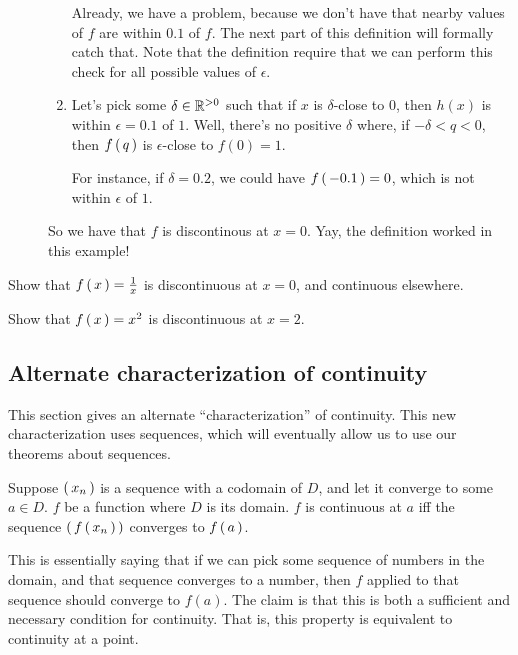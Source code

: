 \begin{example}
\begin{description}
\begin{enumerate}
      Already, we have a problem, because we don't have that nearby values of
      $f$ are within $0.1$ of $f$. The next part of this definition will
      formally catch that. Note that the definition  require that we
      can perform this check for all possible values of $\epsilon$.

    \item Let's pick some $\delta \in \mathbb{R}^{>0}$ such that if $x$ is
      $\delta$-close to $0$, then $h(x)$ is within $\epsilon = 0.1$ of
      $1$. Well, there's no positive $\delta$ where, if $-\delta < q < 0$, then
      $f \left(\, q \,\right)$ is $\epsilon$-close to $f(0) = 1$.

      For instance, if $\delta = 0.2$, we could have $f \left(\, -0.1 \,\right) = 0$, which
      is not within $\epsilon$ of $1$.
    \end{enumerate}

    So we have that $f$ is discontinous at $x = 0$. Yay, the definition worked
    in this example!
  \end{description}
\end{example}

\begin{exercise}
  Show that $f \left(\, x \,\right) = \frac{1}{x}$ is discontinuous at $x = 0$, and
  continuous elsewhere.
\end{exercise}
\begin{exercise}
  Show that $f \left(\, x \,\right) = x^2$ is discontinuous at $x = 2$.
\end{exercise}

\subsection{Alternate characterization of continuity}

This section gives an alternate ``characterization'' of continuity. This new
characterization uses sequences, which will eventually allow us to use our
theorems about sequences.

\begin{theorem}
  \label{thm:cont-sequence}
  Suppose $\left(\, x_n \,\right)$ is a sequence with a codomain of $D$, and let it
  converge to some $a \in D$. $f$ be a function where $D$ is its domain. $f$ is
  continuous at $a$ iff the sequence $\left(\, f \left(\, x_n \,\right) \,\right)$ converges to
  $f \left(\, a \,\right)$.
\end{theorem}

This is essentially saying that if we can pick some sequence of numbers in the
domain, and that sequence converges to a number, then $f$ applied to that
sequence should converge to $f(a)$. The claim is that this is both a sufficient
and necessary condition for continuity. That is, this property is equivalent to
continuity at a point.

